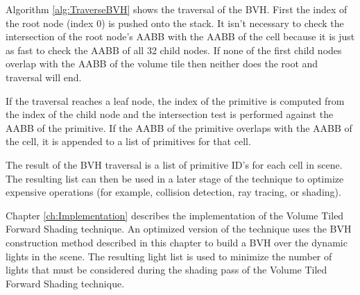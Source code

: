 Algorithm \ref{alg:TraverseBVH} shows the traversal of the BVH. First the index of the root node (index $0$) is pushed onto the stack. It isn't necessary to check the intersection of the root node's AABB with the AABB of the cell because it is just as fast to check the AABB of all 32 child nodes. If none of the first child nodes overlap with the AABB of the volume tile then neither does the root and traversal will end.

If the traversal reaches a leaf node, the index of the primitive is computed from the index of the child node and the intersection test is performed against the AABB of the primitive. If the AABB of the primitive overlaps with the AABB of the cell, it is appended to a list of primitives for that cell.

The result of the BVH traversal is a list of primitive ID's for each cell in scene. The resulting list can then be used in a later stage of the technique to optimize expensive operations (for example, collision detection, ray tracing, or shading). 

Chapter \ref{ch:Implementation} describes the implementation of the Volume Tiled Forward Shading technique. An optimized version of the technique uses the BVH construction method described in this chapter to build a BVH over the dynamic lights in the scene. The resulting light list is used to minimize the number of lights that must be considered during the shading pass of the Volume Tiled Forward Shading technique.
